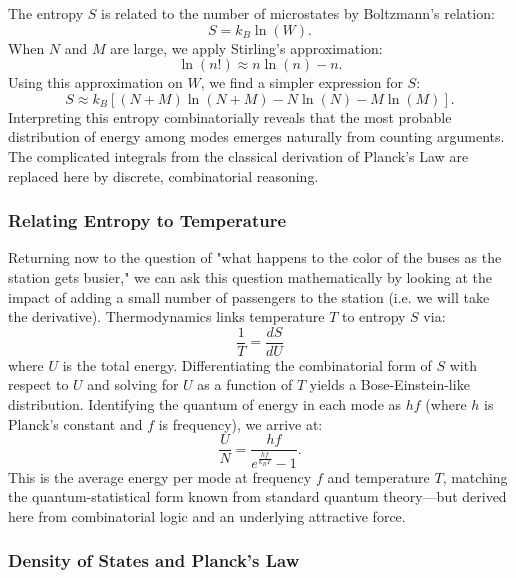 \documentclass{article}
\begin{document}
The entropy $S$ is related to the number of microstates by Boltzmann’s relation:
\[
S = k_B \ln(W).
\]
\newline
When $N$ and $M$ are large, we apply Stirling’s approximation:
\[
\ln(n!) \approx n \ln(n) - n.
\]
Using this approximation on $W$, we find a simpler expression for $S$:
\[
S \approx k_B \left[ (N+M)\ln(N+M) - N\ln(N) - M\ln(M)\right].
\]
\newline
Interpreting this entropy combinatorially reveals that the most probable distribution of energy among modes emerges naturally from counting arguments. The complicated integrals from the classical derivation of Planck’s Law are replaced here by discrete, combinatorial reasoning.

\subsubsection*{Relating Entropy to Temperature}
Returning now to the question of "what happens to the color of the buses as the station gets busier," we can ask this question mathematically by looking at the impact of adding a small number of passengers to the station  (i.e. we will take the derivative). Thermodynamics links temperature $T$ to entropy $S$ via:
\[
\frac{1}{T} = \frac{dS}{dU}
\]
where $U$ is the total energy. Differentiating the combinatorial form of $S$ with respect to $U$ and solving for $U$ as a function of $T$ yields a Bose-Einstein-like distribution. Identifying the quantum of energy in each mode as $hf$ (where $h$ is Planck’s constant and $f$ is frequency), we arrive at:
\[
\frac{U}{N} = \frac{hf}{e^{\frac{hf}{k_B T}} - 1}.
\]
\newline
This is the average energy per mode at frequency $f$ and temperature $T$, matching the quantum-statistical form known from standard quantum theory—but derived here from combinatorial logic and an underlying attractive force.

\subsubsection*{Density of States and Planck’s Law}
\end{document}
